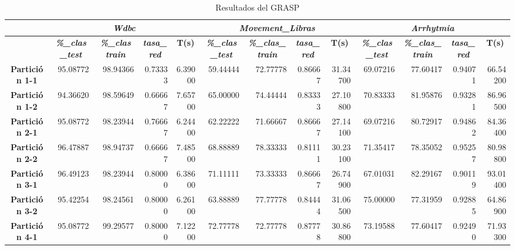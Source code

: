 \documentclass[a4paper,11pt]{article}
\begin{document}
  \begin{table}[H]
  \caption{Resultados del GRASP}
  \begin{adjustbox}{width=1.1\textwidth}
  \begin{tabular}{|c|r|r|r|r|r|r|r|r|r|r|r|r|}
  \hline
  \multicolumn{1}{|l|}{} & \multicolumn{ 4}{c|}{\textbf{\textit{Wdbc}}} & \multicolumn{ 4}{c|}{\textbf{\textit{Movement\_Libras}}} & \multicolumn{ 4}{c|}{\textbf{\textit{Arrhytmia}}} \\ \hline
  \multicolumn{1}{|l|}{} & \multicolumn{1}{c|}{\textbf{\textit{\%\_clas\_test}}} & \multicolumn{1}{c|}{\textbf{\textit{\%\_clas train}}} & \multicolumn{1}{c|}{\textbf{\textit{tasa\_red}}} & \multicolumn{1}{c|}{\textbf{T(s)}} & \multicolumn{1}{c|}{\textbf{\textit{\%\_clas\_test}}} & \multicolumn{1}{c|}{\textbf{\textit{\%\_clas\_train}}} & \multicolumn{1}{c|}{\textbf{\textit{tasa\_red}}} & \multicolumn{1}{c|}{\textbf{T(s)}} & \multicolumn{1}{c|}{\textbf{\textit{\%\_clas\_test}}} & \multicolumn{1}{c|}{\textbf{\textit{\%\_clas\_train}}} & \multicolumn{1}{c|}{\textbf{\textit{tasa\_red}}} & \multicolumn{1}{c|}{\textbf{T(s)}} \\ \hline
  \textbf{Partición 1-1} & 95.08772 & 98.94366 & 0.73333 & 6.39000 & 59.44444 & 72.77778 & 0.86667 & 31.34700 & 69.07216 & 77.60417 & 0.94071 & 66.54200 \\ \hline
  \textbf{Partición 1-2} & 94.36620 & 98.59649 & 0.66667 & 7.65700 & 65.00000 & 74.44444 & 0.83333 & 27.10800 & 70.83333 & 81.95876 & 0.93281 & 86.96500 \\ \hline
  \textbf{Partición 2-1} & 95.08772 & 98.23944 & 0.76667 & 6.24400 & 62.22222 & 71.66667 & 0.86667 & 27.14100 & 69.07216 & 80.72917 & 0.94862 & 84.36400 \\ \hline
  \textbf{Partición 2-2} & 96.47887 & 98.94737 & 0.66667 & 7.48500 & 68.88889 & 78.33333 & 0.81111 & 30.23100 & 71.35417 & 78.35052 & 0.95257 & 80.98800 \\ \hline
  \textbf{Partición 3-1} & 96.49123 & 98.23944 & 0.80000 & 6.38600 & 71.11111 & 73.33333 & 0.86667 & 26.74900 & 67.01031 & 82.29167 & 0.90119 & 93.01400 \\ \hline
  \textbf{Partición 3-2} & 95.42254 & 98.24561 & 0.80000 & 6.26100 & 63.88889 & 77.77778 & 0.84444 & 31.06500 & 75.00000 & 77.31959 & 0.92885 & 64.86900 \\ \hline
  \textbf{Partición 4-1} & 95.08772 & 99.29577 & 0.80000 & 7.12200 & 72.77778 & 72.77778 & 0.87778 & 30.86800 & 73.19588 & 77.60417 & 0.92490 & 71.93300 \\ \hline

\end{tabular}
\end{adjustbox}
\end{table}
\end{document}
